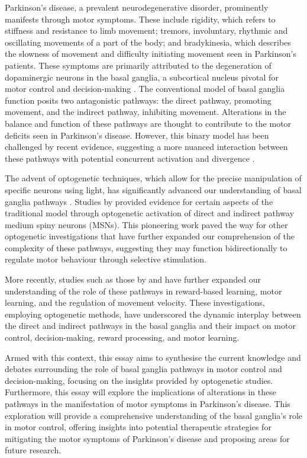 \documentclass[10pt]{article}
\begin{document}
\begin{sloppypar}
  Parkinson’s disease, a prevalent neurodegenerative disorder, prominently manifests through motor symptoms. These include rigidity, which refers to stiffness and resistance to limb movement; tremors, involuntary, rhythmic and oscillating movements of a part of the body; and bradykinesia, which describes the slowness of movement and difficulty initiating movement seen in Parkinson’s patients. These symptoms are primarily attributed to the degeneration of dopaminergic neurons in the basal ganglia, a subcortical nucleus pivotal for motor control and decision-making \citep{kravitz_regulation_2010}. The conventional model of basal ganglia function posits two antagonistic pathways: the direct pathway, promoting movement, and the indirect pathway, inhibiting movement. Alterations in the balance and function of these pathways are thought to contribute to the motor deficits seen in Parkinson’s disease. However, this binary model has been challenged by recent evidence, suggesting a more nuanced interaction between these pathways with potential concurrent activation and divergence \citep{dunovan_believer-skeptic_2016}.

  The advent of optogenetic techniques, which allow for the precise manipulation of specific neurons using light, has significantly advanced our understanding of basal ganglia pathways \citep{kravitz_regulation_2010, cui_concurrent_2013}. Studies by \cite{kravitz_regulation_2010} provided evidence for certain aspects of the traditional model through optogenetic activation of direct and indirect pathway medium spiny neurons (MSNs). This pioneering work paved the way for other optogenetic investigations that have further expanded our comprehension of the complexity of these pathways, suggesting they may function bidirectionally \citep{yttri_opponent_2016} to regulate motor behaviour through selective stimulation.

  More recently, studies such as those by \cite{hilt_evidence_2016} and \cite{wang_direct_2015} have further expanded our understanding of the role of these pathways in reward-based learning, motor learning, and the regulation of movement velocity. These investigations, employing optogenetic methods, have underscored the dynamic interplay between the direct and indirect pathways in the basal ganglia and their impact on motor control, decision-making, reward processing, and motor learning.

  Armed with this context, this essay aims to synthesise the current knowledge and debates surrounding the role of basal ganglia pathways in motor control and decision-making, focusing on the insights provided by optogenetic studies. Furthermore, this essay will explore the implications of alterations in these pathways in the manifestation of motor symptoms in Parkinson’s disease. This exploration will provide a comprehensive understanding of the basal ganglia’s role in motor control, offering insights into potential therapeutic strategies for mitigating the motor symptoms of Parkinson’s disease and proposing areas for future research.


\end{sloppypar}
\end{document}

